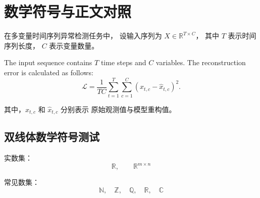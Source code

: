 \par
\endgroup

\section{数学符号与正文对照}

在多变量时间序列异常检测任务中，
设输入序列为 $X \in \mathbb{R}^{T \times C}$，
其中 $T$ 表示时间序列长度，
$C$ 表示变量数量。

The input sequence contains $T$ time steps and $C$ variables.
The reconstruction error is calculated as follows:
\begin{equation}
    \mathcal{L}
    = \frac{1}{TC}
    \sum_{t=1}^{T}
    \sum_{c=1}^{C}
    (x_{t,c}-\hat{x}_{t,c})^2.
\end{equation}

其中，$x_{t,c}$ 和 $\hat{x}_{t,c}$ 分别表示
原始观测值与模型重构值。


\subsection{双线体数学符号测试}

实数集：
\[
  \mathbb{R},\qquad
  \mathbb{R}^{m\times n}
\]

常见数集：
\[
  \mathbb{N},\quad
  \mathbb{Z},\quad
  \mathbb{Q},\quad
  \mathbb{R},\quad
  \mathbb{C}
\]